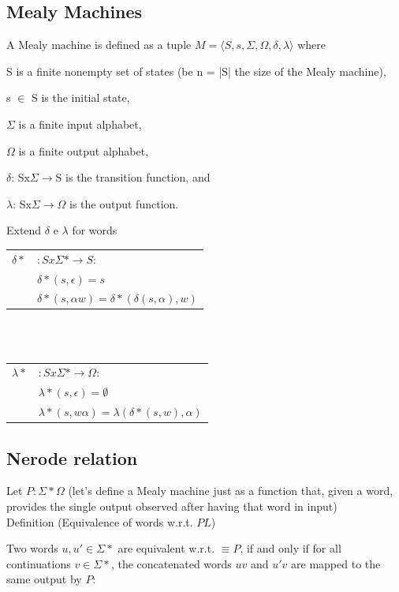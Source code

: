 \subsection{Mealy Machines}
A Mealy machine is defined as a tuple $M = \langle S, s, \Sigma, \Omega, \delta, \lambda\rangle$ where
\begin{itemize*}
	\item S is a finite nonempty set of states (be n = |S| the size of the Mealy machine),
	\item s $\in$ S is the initial state,
	\item $\Sigma$ is a finite input alphabet,
	\item $\Omega$ is a finite output alphabet,
	\item $\delta$: Sx$\Sigma\rightarrow$S is the transition function, and
	\item $\lambda$: Sx$\Sigma\rightarrow\Omega$ is the output function.
\end{itemize*}

Extend $\delta$ e $\lambda$ for words\\

\begin{tabular}{cl}
	$\delta*$ & $: Sx\Sigma * \rightarrow S$: \\ 
	& $\delta* (s,\epsilon)= s$\\ 
	& $\delta* (s, \alpha w) = \delta * (\delta(s,  \alpha), w)$ 
\end{tabular} 
~\\\\
\begin{tabular}{cl}	
	$\lambda*$ & $: Sx\Sigma * \rightarrow\Omega$:\\
	& $\lambda* (s,\epsilon)=\emptyset$\\
	& $\lambda* (s, w\alpha) = \lambda(\delta * (s, w), \alpha)$
\end{tabular} 

\subsection{Nerode relation}

Let $P:\Sigma*\Omega$ {\tiny (let’s define a Mealy machine just as a function that, given a word, provides the single output observed after having that word in input)}\\


Definition (Equivalence of words w.r.t. $PL$)


Two words $u,u' \in \Sigma*$ are equivalent w.r.t. $\equiv P$, if and only if for all continuations $v \in \Sigma*$, the concatenated words $uv$ and $u'v$ are mapped to the same output by $P$:

